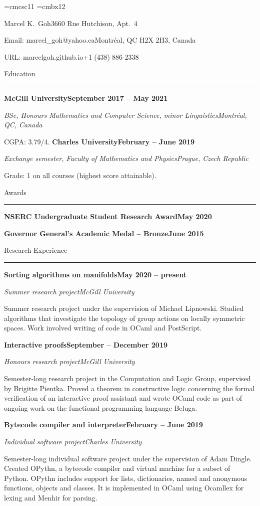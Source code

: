 
\font\elevensc=cmcsc11  %
\font\bigbold=cmbx12  %

\parindent=0pt  %

\def\sectheader#1{{\bigskip\elevensc #1}\smallskip\hrule\medskip}
\def\leftright#1#2{{#1}\hfill{#2}\par}

\leftright{\bigbold Marcel K.\ Goh}{3660 Rue Hutchison, Apt.\ 4}
\leftright{Email: marcel\_goh@yahoo.ca}{Montr\'eal, QC H2X 2H3, Canada}
\leftright{URL: marcelgoh.github.io}{+1$\;$(438)$\;$886-2338}

\sectheader{Education}

\leftright{\bf McGill University}{\bf September 2017 -- May 2021}
\leftright{\sl BSc, Honours Mathematics and Computer Science, minor Linguistics}{\sl Montr\'eal, QC, Canada}
CGPA: 3.79/4.
\medskip
\leftright{\bf Charles University}{\bf February -- June 2019}
\leftright{\sl Exchange semester, Faculty of Mathematics and Physics}{\sl Prague, Czech Republic}
Grade: 1 on all courses (highest score attainable).

\sectheader{Awards}

\leftright{\bf NSERC Undergraduate Student Research Award}{\bf May 2020}
\smallskip
\leftright{\bf Governor General's Academic Medal -- Bronze}{\bf June 2015}

\sectheader{Research Experience}

\leftright{\bf Sorting algorithms on manifolds}{\bf May 2020 -- present}
\leftright{\sl Summer research project}{\sl McGill University}
\smallskip
Summer research project under the supervision of Michael Lipnowski.
Studied algorithms that investigate the topology of group actions on locally symmetric spaces.
Work involved writing of code in OCaml and PostScript.
\medskip

\leftright{\bf Interactive proofs}{\bf September -- December 2019}
\leftright{\sl Honours research project}{\sl McGill University}
\smallskip
Semester-long research project in the Computation and Logic Group, supervised
by Brigitte Pientka.
Proved a theorem in constructive logic concerning the formal verification
of an interactive proof assistant and wrote OCaml code as part of
ongoing work on the functional programming language Beluga.
\medskip

\leftright{\bf Bytecode compiler and interpreter}{\bf February -- June 2019}
\leftright{\sl Individual software project}{\sl Charles University}
\smallskip
Semester-long individual software project under the supervision of Adam Dingle.
Created OPythn, a bytecode compiler and virtual machine for a subset of Python.
OPythn includes support for lists, dictionaries, named and anonymous functions, objects and classes.
It is implemented in OCaml using Ocamllex for lexing and Menhir for parsing.
\medskip

